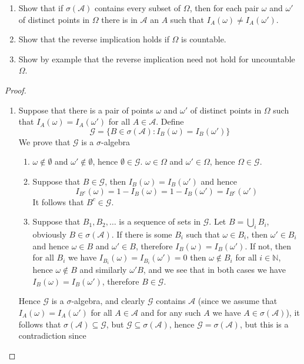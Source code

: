 \documentclass[11pt]{article}
\newcommand{\N}{\mathbb{N}}
\newcommand{\A}{\mathcal{A}}
\newcommand{\G}{\mathcal{G}}
\newcommand{\seq}{\subseteq}
\newcommand{\om}{\omega}
\newcommand{\Om}{\Omega}
\newcommand{\es}{\emptyset}
\newenvironment{exercise}[2][Exercise]{\begin{trivlist}
\item[\hskip \labelsep {\bfseries #1}\hskip \labelsep {\bfseries #2.}]}{\end{trivlist}}
\begin{document}
\begin{exercise}{2.10}
    \begin{enumerate}
        \item Show that if $\sigma (\A)$ contains every subset of $\Omega$, then for each pair $\om$ and $\om'$ of distinct points in $\Om$ there is in $\A$ an $A$ such that $I_A (\om) \neq I_A (\om')$.
        \item Show that the reverse implication holds if $\Om$ is countable.
        \item Show by example that the reverse implication need not hold for uncountable $\Om$.
    \end{enumerate}
\end{exercise}
\begin{proof}
    \begin{enumerate}
        \item Suppose that there is a pair of points $\om$ and $\om'$ of distinct points in $\Om$ such that $I_{A} (\om) = I_{A} (\om')$ for all $A \in \A$. Define 
        \[ \G = \{ B \in \sigma (\A): I_{B} (\om) = I_{B} (\om') \} \]
        We prove that $\G$ is a $\sigma$-algebra
        \begin{enumerate}
            \item $\om \notin \es$ and $\om' \not\in \es$, hence $\es \in \G$. $\om \in \Om$ and $\om' \in \Om$, hence $\Om \in \G$.
            \item Suppose that $B \in \G$, then $I_B (\om) = I_B (\om')$ and hence 
            \[ I_{B^c} (\om) = 1 - I_{B} (\om) = 1 - I_B (\om') = I_{B^c} (\om') \]
            It follows that $B^{c} \in \G$.
            \item Suppose that $B_{1}, B_{2}, \ldots$ is a sequence of sets in $\G$. Let $B = \bigcup_{i} B_i$, obviously $B \in \sigma (\A)$. If there is some $B_{i}$ such that $\om \in B_i$, then $\om' \in B_i$ and hence $\om \in B$ and $\om' \in B$, therefore $I_B (\om) = I_B (\om')$. If not, then for all $B_{i}$ we have $I_{B_i} (\om) = I_{B_i} (\om') = 0$ then $\om \notin B_{i}$ for all $i \in \N$, hence $\om \notin B$ and similarly $\om' B$, and we see that in both cases we have $I_B (\om) = I_B (\om')$, therefore $B \in \G$.
        \end{enumerate}
        Hence $\G$ is a $\sigma$-algebra, and clearly $\G$ contains $\A$ (since we assume that $I_A (\om) = I_A (\om')$ for all $A \in \A$ and for any such $A$ we have $A \in \sigma(\A)$), it follows that $\sigma (\A) \seq \G$, but $\G \seq \sigma (\A)$, hence $\G = \sigma (\A)$, but this is a contradiction since 

\end{enumerate}
\end{proof}
\end{document}
